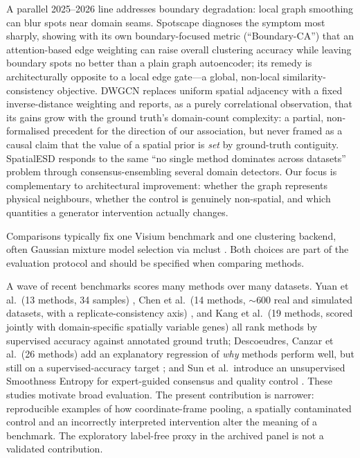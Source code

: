 \documentclass[journal]{IEEEtran}
\begin{document}
A parallel
2025--2026 line addresses boundary degradation: local graph smoothing can blur spots near domain seams. Spotscape \citep{oh2025spotscape} diagnoses the symptom most sharply,
showing with its own boundary-focused metric (``Boundary-CA'') that an attention-based edge weighting can
raise overall clustering accuracy while leaving boundary spots no better than a plain graph autoencoder;
its remedy is architecturally opposite to a local edge gate---a global, non-local similarity-consistency
objective. DWGCN \citep{peng2026dwgcn} replaces uniform spatial adjacency with a fixed inverse-distance
weighting and reports, as a purely correlational observation, that its gains grow with the ground truth's
domain-count complexity: a partial, non-formalised precedent for the direction of our association, but never
framed as a causal claim that the value of a spatial prior is \emph{set} by ground-truth contiguity.
SpatialESD \citep{cao2025spatialesd} responds to the same ``no single method dominates across datasets''
problem through consensus-ensembling several domain detectors. Our focus is complementary to architectural improvement: whether the graph represents physical neighbours, whether the control is genuinely non-spatial, and which quantities a generator intervention actually changes.

Comparisons typically fix one Visium benchmark
\citep{maynard2021dlpfc} and one clustering backend, often Gaussian mixture model selection via mclust
\citep{scrucca2016mclust}. Both choices are part of the evaluation protocol and should be specified when comparing methods.

A wave of recent benchmarks scores many methods over many
datasets. Yuan et al.\ (13 methods, 34 samples) \citep{yuan2024benchmark}, Chen et al.\ (14 methods, $\sim$600
real and simulated datasets, with a replicate-consistency axis) \citep{chen2025imeta}, and Kang et al.\ (19
methods, scored jointly with domain-specific spatially variable genes) \citep{kang2025nar} all rank methods by
supervised accuracy against annotated ground truth; Descoeudres, Canzar et al.\ (26 methods) add an explanatory
regression of \emph{why} methods perform well, but still on a supervised-accuracy target
\citep{canzar2026biorxiv}; and Sun et al.\ introduce an unsupervised Smoothness Entropy for expert-guided
consensus and quality control \citep{sun2025smoothness}. These studies motivate broad evaluation. The present contribution is narrower: reproducible examples of how coordinate-frame pooling, a spatially contaminated control and an incorrectly interpreted intervention alter the meaning of a benchmark. The exploratory label-free proxy in the archived panel is not a validated contribution.
\end{document}
